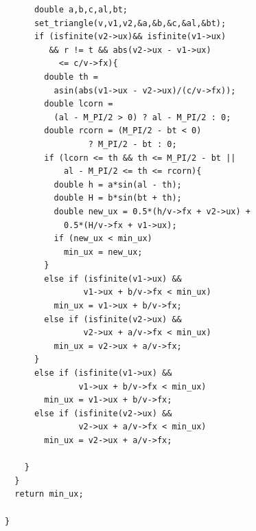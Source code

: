 \begin{verbatim}
      double a,b,c,al,bt;
      set_triangle(v,v1,v2,&a,&b,&c,&al,&bt);
      if (isfinite(v2->ux)&& isfinite(v1->ux) 
         && r != t && abs(v2->ux - v1->ux)
           <= c/v->fx){
        double th = 
          asin(abs(v1->ux - v2->ux)/(c/v->fx));
        double lcorn = 
          (al - M_PI/2 > 0) ? al - M_PI/2 : 0;
        double rcorn = (M_PI/2 - bt < 0) 
                 ? M_PI/2 - bt : 0;
        if (lcorn <= th && th <= M_PI/2 - bt || 
            al - M_PI/2 <= th <= rcorn){
          double h = a*sin(al - th);
          double H = b*sin(bt + th);
          double new_ux = 0.5*(h/v->fx + v2->ux) +
            0.5*(H/v->fx + v1->ux);
          if (new_ux < min_ux)
            min_ux = new_ux;
        }
        else if (isfinite(v1->ux) && 
                v1->ux + b/v->fx < min_ux)
          min_ux = v1->ux + b/v->fx;
        else if (isfinite(v2->ux) && 
                v2->ux + a/v->fx < min_ux)
          min_ux = v2->ux + a/v->fx;
      }
      else if (isfinite(v1->ux) && 
               v1->ux + b/v->fx < min_ux)
        min_ux = v1->ux + b/v->fx;
      else if (isfinite(v2->ux) && 
               v2->ux + a/v->fx < min_ux)
        min_ux = v2->ux + a/v->fx;

    }
  }
  return min_ux;

}

\end{verbatim}
\large


